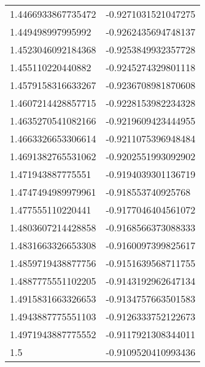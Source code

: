 \begin{supertabular}{ll}
1.4466933867735472  & -0.9271031521047275   \\
1.449498997995992   & -0.9262435694748137   \\
1.4523046092184368  & -0.9253849932357728   \\
1.455110220440882   & -0.9245274329801118   \\
1.4579158316633267  & -0.9236708981870608   \\
1.4607214428857715  & -0.9228153982234328   \\
1.4635270541082166  & -0.9219609423444955   \\
1.4663326653306614  & -0.9211075396948484   \\
1.4691382765531062  & -0.9202551993092902   \\
1.471943887775551   & -0.9194039301136719   \\
1.4747494989979961  & -0.918553740925768    \\
1.477555110220441   & -0.9177046404561072   \\
1.4803607214428858  & -0.9168566373088333   \\
1.4831663326653308  & -0.9160097399825617   \\
1.4859719438877756  & -0.9151639568711755   \\
1.4887775551102205  & -0.9143192962647134   \\
1.4915831663326653  & -0.9134757663501583   \\
1.4943887775551103  & -0.9126333752122673   \\
1.4971943887775552  & -0.9117921308344011   \\
1.5                 & -0.9109520410993436   \\
\end{supertabular}